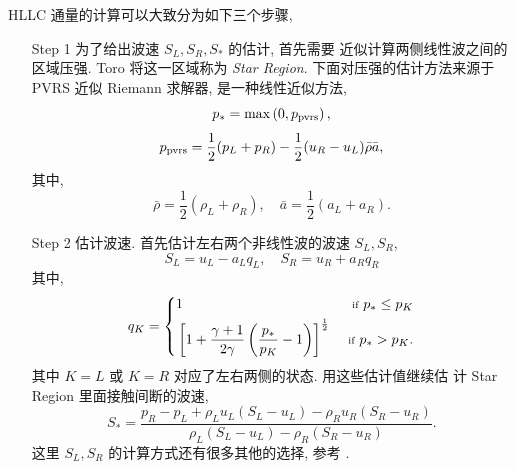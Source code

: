 \begin{itemize}
  HLLC 通量的计算可以大致分为如下三个步骤,
  \begin{itemize}
  \item[Step 1] 为了给出波速 $S_{L},S_{R},S_{*}$ 的估计, 首先需要
    近似计算两侧线性波之间的区域压强. Toro 将这一区域称为 {\it
      Star Region}. 下面对压强的估计方法来源于 PVRS 近似 Riemann
    求解器, 是一种线性近似方法,
    \begin{equation}
      \label{eq:pre-est}
      p_{\ast} = \max \left( 0, p_{\mbox{\scriptsize pvrs}}
      \right),
    \end{equation}
    \begin{equation}
      \label{eq:star-p}
      p_{\mbox{\scriptsize pvrs}} = \frac{1}{2}(p_{L} + p_{R}) -
      \frac{1}{2}(u_{R} - u_{L}) \bar{\rho} \bar{a},
    \end{equation}
    其中,
    \begin{equation}
      \label{eq:average-rho-sonic}
      \bar{\rho} = \frac{1}{2} (\rho_{L} + \rho_{R}), \quad
      \bar{a} = \frac{1}{2} (a_{L} + a_{R}).
    \end{equation}
  \item[Step 2] 估计波速. 首先估计左右两个非线性波的波速 $S_{L}, S_{R}$,
    \begin{equation}
      \label{eq:wave-speed}
      S_{L} = u_{L} - a_{L}q_{L}, \quad S_{R} = u_{R} + a_{R} q_{R}
    \end{equation}
    其中,
    \begin{equation}
      \label{eq:q-symbol}
      q_{K} = \left\{
        \begin{aligned}
          & 1 & ~\mbox{\scriptsize if} ~ p_{\ast} \le p_{K}\\
          &\left[ 1 + \frac{\gamma + 1}{2\gamma} \left(
              \frac{p_{\ast}}{p_{K}} - 1 \right)
          \right]^{\frac{1}{2}} & ~\mbox{\scriptsize if} ~
          p_{\ast} > p_{K}.
        \end{aligned}
      \right.
    \end{equation}
    其中 $K=L$ 或 $K=R$ 对应了左右两侧的状态. 用这些估计值继续估
    计 Star Region 里面接触间断的波速,
    \begin{equation}
      \label{eq:star-region-estimate-sonice-speed}
      S_{\ast} = \frac{p_{R} - p_{L} + \rho_{L} u_{L}(S_{L} -
        u_{L}) -
        \rho_{R}u_{R}(S_{R}-u_{R})}{\rho_{L}(S_{L}-u_{L}) -
        \rho_{R}(S_{R}- u_{R})}.
    \end{equation}
    这里 $S_{L}, S_{R}$ 的计算方式还有很多其他的选择, 参考 \cite{Toro2009}.

\end{itemize}
\end{itemize}
